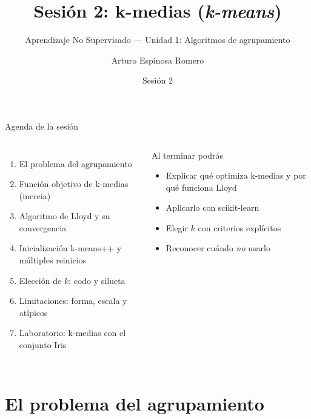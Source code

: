 \documentclass[aspectratio=169,11pt]{beamer}
\title[Sesión 2: k-medias]{Sesión 2: k-medias (\emph{k-means})}
\subtitle{Aprendizaje No Supervisado --- Unidad 1: Algoritmos de agrupamiento}
\author[A. Espinosa Romero]{Arturo Espinosa Romero}
\institute[FMAT]{Maestría en Inteligencia Artificial \\ Facultad de Matemáticas}
\date{Sesión 2}
\begin{document}
\begin{frame}
  \titlepage
\end{frame}

\begin{frame}{Agenda de la sesión}
  \begin{columns}[T]
    \begin{enumerate}
      \item El problema del agrupamiento
      \item Función objetivo de k-medias (inercia)
      \item Algoritmo de Lloyd y su convergencia
      \item Inicialización k-means++ y múltiples reinicios
      \item Elección de $k$: codo y silueta
      \item Limitaciones: forma, escala y atípicos
      \item Laboratorio: k-medias con el conjunto Iris
    \end{enumerate}
    \begin{block}{Al terminar podrás}
      \begin{itemize}
        \item Explicar qué optimiza k-medias y por qué funciona Lloyd
        \item Aplicarlo con scikit-learn
        \item Elegir $k$ con criterios explícitos
        \item Reconocer cuándo \emph{no} usarlo
      \end{itemize}
    \end{block}
  \end{columns}
\end{frame}

\section{El problema del agrupamiento}
\end{document}
